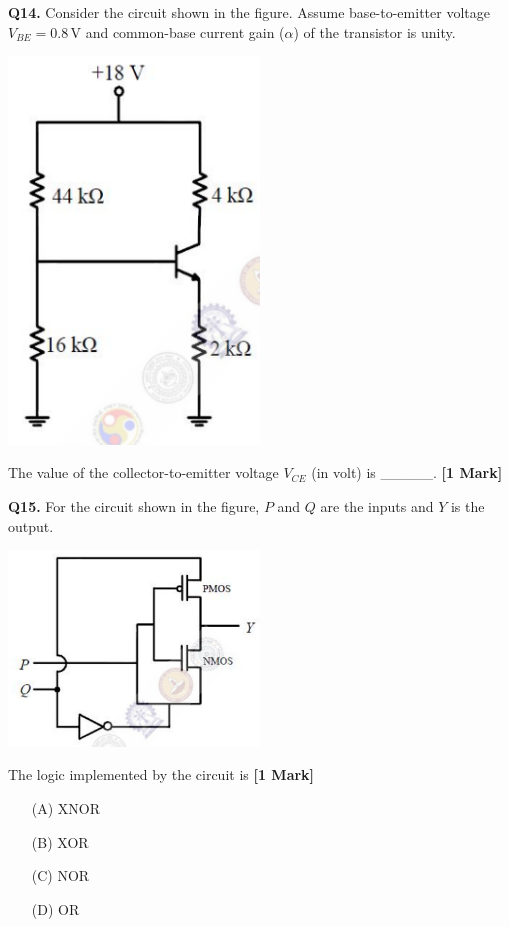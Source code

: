 \documentclass[11pt]{article}
\newcommand{\questiona}[2]{
    \noindent\textbf{Q#2.} #1 \hfill \textbf{[1 Mark]}
}
\begin{document}
\vspace{0.5cm}

\questiona{Consider the circuit shown in the figure. Assume base-to-emitter voltage $V_{BE} = 0.8\,\text{V}$ and common-base current gain ($\alpha$) of the transistor is unity.
\begin{center}
\includegraphics[width=0.5\textwidth]{figures/14.png}
\end{center}
The value of the collector-to-emitter voltage $V_{CE}$ (in volt) is \_\_\_\_\_.}{14}

\vspace{0.5cm}

\questiona{For the circuit shown in the figure, $P$ and $Q$ are the inputs and $Y$ is the output.
\begin{center}
\includegraphics[width=0.5\textwidth]{figures/15.png}
\end{center}
The logic implemented by the circuit is}{15}
\begin{enumerate}
    \item[(A)] XNOR
    \item[(B)] XOR
    \item[(C)] NOR
    \item[(D)] OR
\end{enumerate}
\end{document}
